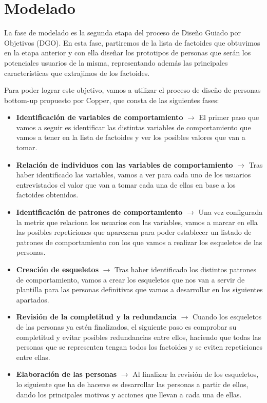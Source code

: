 \section{Modelado}
La fase de modelado es la segunda etapa del proceso de Diseño Guiado por Objetivos (DGO). En esta fase, partiremos de la lista de factoides que
obtuvimos en la etapa anterior y con ella diseñar los prototipos de personas que serán los potenciales usuarios de la misma, representando además
las principales características que extrajimos de los factoides.

Para poder lograr este objetivo, vamos a utilizar el proceso de diseño de personas bottom-up propuesto por Copper, que consta de las siguientes fases:
\begin{itemize}
    \item \textbf{Identificación de variables de comportamiento} $\rightarrow$ El primer paso que vamos a seguir es identificar las distintas variables de comportamiento que vamos a tener en la lista de factoides y ver los posibles valores que van a tomar.
    \item \textbf{Relación de individuos con las variables de comportamiento} $\rightarrow$ Tras haber identificado las variables, vamos a ver para cada uno de los usuarios entrevistados el valor que van a tomar cada una de ellas en base a los factoides obtenidos.
    \item \textbf{Identificación de patrones de comportamiento} $\rightarrow$ Una vez configurada la metriz que relaciona los usuarios con las variables, vamos a marcar en ella las posibles repeticiones que aparezcan para poder establecer un listado de patrones de comportamiento con los que vamos a realizar los esqueletos de las personas.
    \item \textbf{Creación de esqueletos} $\rightarrow$ Tras haber identificado los distintos patrones de comportamiento, vamos a crear los esqueletos que nos van a servir de plantilla para las personas definitivas que vamos a desarrollar en los siguientes apartados.
    \item \textbf{Revisión de la completitud y la redundancia} $\rightarrow$ Cuando los esqueletos de las personas ya estén finalizados, el siguiente paso es comprobar su completitud y evitar posibles redundancias entre ellos, haciendo que todas las personas que se representen tengan todos los factoides y se eviten repeticiones entre ellas.
    \item \textbf{Elaboración de las personas} $\rightarrow$ Al finalizar la revisión de los esqueletos, lo siguiente que ha de hacerse es desarrollar las personas a partir de ellos, dando los principales motivos y acciones que llevan a cada una de ellas.

\end{itemize}
